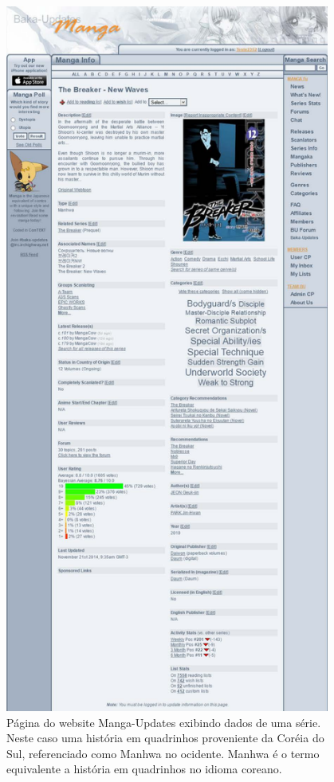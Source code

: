 \documentclass[12pt]{article}
\begin{document}
\begin{figure}[H]
\centering
\includegraphics[height=0.95\textheight,width=0.95\textwidth]{break.pdf}
\caption{Página do website Manga-Updates exibindo dados de uma série. Neste caso uma história em quadrinhos proveniente da Coréia do Sul, referenciado como Manhwa no ocidente. Manhwa é o termo equivalente a história em quadrinhos no idioma coreano.} \label{collection}
\end{figure}
\end{document}
